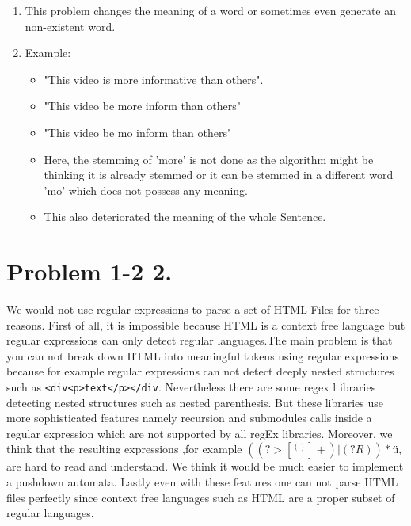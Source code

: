 \documentclass{article}
\begin{document}
{\begin{enumerate}
\begin{enumerate}
\begin{itemize}
\begin{enumerate}
                \item This problem changes the meaning of a word or sometimes even generate an non-existent word.
                \item Example:
                \begin{itemize}
                    \item "This video is more informative than others".
                    \item "This video be more inform than others"
                    \item "This video be mo inform than others"
                    \item Here, the stemming of 'more' is not done as the algorithm might be thinking it is already stemmed or it can be stemmed in a different word 'mo' which does not possess any meaning.
                    \item This also deteriorated the meaning of the whole Sentence.
                \end{itemize}
            \end{enumerate}
        \end{itemize}
    \end{enumerate}
\end{enumerate}
}

\section*{Problem 1-2 2.}
We would not use regular expressions to parse a set of HTML Files for three reasons.
First of all, it is impossible because HTML is a context free language but regular expressions 
can only detect regular languages.The main problem is that you can not break down HTML into 
meaningful tokens using regular expressions because for example regular expressions can not detect 
deeply nested structures such as \verb+<div<p>text</p></div+. Nevertheless there are some regex l
ibraries detecting nested structures such as nested parenthesis. But these libraries use more 
sophisticated features namely recursion and submodules calls inside a regular expression which 
are not supported by  all regEx  libraries. Moreover, we think that the resulting expressions
,for example \( ( (?>[^()]+) | (?R) )* \)ü, are hard to read and understand. We think it 
would be much easier to implement a pushdown automata. Lastly even with these features one can 
not parse HTML files perfectly  since context free languages such as HTML are a proper subset
of regular languages.
\end{document}
